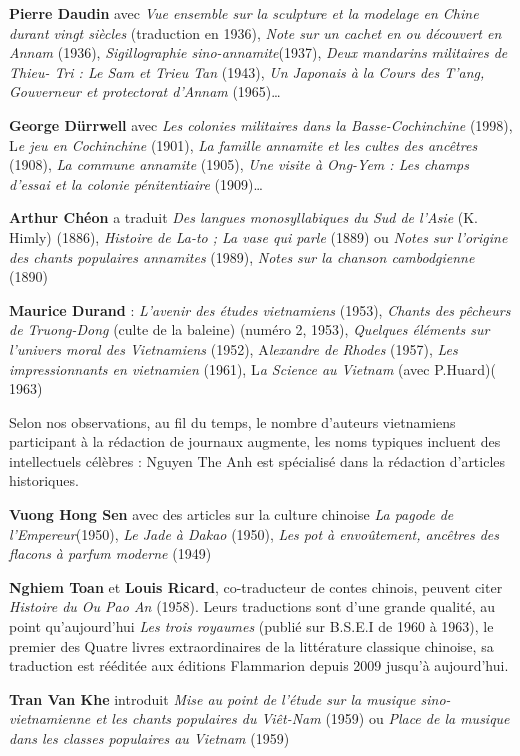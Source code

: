 \textbf{Pierre Daudin} avec \textit{Vue ensemble sur la sculpture et la modelage en Chine durant vingt siècles} (traduction en 1936), \textit{Note sur un cachet en ou découvert en Annam} (1936), \textit{Sigillographie sino-annamite}(1937), \textit{Deux mandarins militaires de Thieu- Tri : Le Sam et Trieu Tan} (1943), \textit{Un Japonais à la Cours des T'ang, Gouverneur et protectorat d'Annam }(1965)… 

 \textbf{George Dürrwell} avec \textit{Les colonies militaires dans la Basse-Cochinchine} (1998), L\textit{e jeu en Cochinchine} (1901), \textit{La famille annamite et les cultes des ancêtres} (1908), \textit{La commune annamite} (1905),\textit{ Une visite à Ong-Yem : Les champs d'essai et la colonie pénitentiaire} (1909)… 

\textbf{Arthur Chéon} a traduit \textit{Des langues monosyllabiques du Sud de l'Asie} (K. Himly) (1886), \textit{Histoire de La-to ; La vase qui parle} (1889) ou \textit{Notes sur l'origine des chants populaires annamites} (1989), \textit{Notes sur la chanson cambodgienne} (1890) 

\textbf{Maurice Durand} : \textit{L'avenir des études vietnamiens }(1953), \textit{Chants des pêcheurs de Truong-Dong} (culte de la baleine) (numéro 2, 1953), \textit{Quelques éléments sur l'univers moral des Vietnamiens} (1952), A\textit{lexandre de Rhodes} (1957), \textit{Les impressionnants en vietnamien} (1961), L\textit{a Science au Vietnam} (avec P.Huard)( 1963) 

Selon nos observations, au fil du temps, le nombre d'auteurs vietnamiens participant à la rédaction de journaux augmente, les noms typiques incluent des intellectuels célèbres : 
Nguyen The Anh est spécialisé dans la rédaction d'articles historiques. 

\textbf{Vuong Hong Sen} avec des articles sur la culture chinoise \textit{La pagode de l'Empereur}(1950),\textit{ Le Jade à Dakao} (1950), \textit{Les pot à envoûtement, ancêtres des flacons à parfum moderne} (1949) 

\textbf{Nghiem Toan} et \textbf{Louis Ricard}, co-traducteur de contes chinois, peuvent citer \textit{Histoire du Ou Pao An} (1958). Leurs traductions sont d'une grande qualité, au point qu'aujourd'hui \textit{Les trois royaumes} (publié sur B.S.E.I de 1960 à 1963), le premier des Quatre livres extraordinaires de la littérature classique chinoise, sa traduction est rééditée aux éditions Flammarion depuis 2009 jusqu'à aujourd'hui. 

\textbf{Tran Van Khe} introduit \textit{Mise au point de l'étude sur la musique sino-vietnamienne et les chants populaires du Viêt-Nam} (1959) ou \textit{Place de la musique dans les classes populaires au Vietnam} (1959) 

